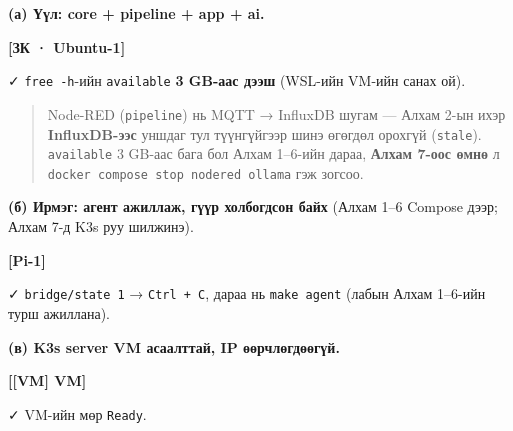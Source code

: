 \textbf{(а) Үүл: core + pipeline + app + ai.}

\textbf{{[}ЗК · Ubuntu-1{]}}

\begin{Shaded}
\begin{Highlighting}[]
\end{Highlighting}
\end{Shaded}

✓ \texttt{free\ -h}-ийн \texttt{available} \textbf{3 GB-аас дээш} (WSL-ийн VM-ийн санах ой).

\begin{quote}
Node-RED (\texttt{pipeline}) нь MQTT → InfluxDB шугам --- Алхам 2-ын ихэр \textbf{InfluxDB-ээс} уншдаг тул түүнгүйгээр шинэ өгөгдөл орохгүй (\texttt{stale}). \texttt{available} 3 GB-аас бага бол Алхам 1--6-ийн дараа, \textbf{Алхам 7-оос өмнө} л \texttt{docker\ compose\ stop\ nodered\ ollama} гэж зогсоо.
\end{quote}

\textbf{(б) Ирмэг: агент ажиллаж, гүүр холбогдсон байх} (Алхам 1--6 Compose дээр; Алхам 7-д K3s руу шилжинэ).

\textbf{{[}Pi-1{]}}

\begin{Shaded}
\begin{Highlighting}[]
\KeywordTok{\&\&} \KeywordTok{\&\&} 
\end{Highlighting}
\end{Shaded}

✓ \texttt{bridge/state\ 1} → \texttt{Ctrl\ +\ C}, дараа нь \texttt{make\ agent} (лабын Алхам 1--6-ийн турш ажиллана).

\textbf{(в) K3s server VM асаалттай, IP өөрчлөгдөөгүй.}

\textbf{{[}{[}VM{]} VM{]}}

\begin{Shaded}
\begin{Highlighting}[]
\end{Highlighting}
\end{Shaded}

✓ VM-ийн мөр \texttt{Ready}.

